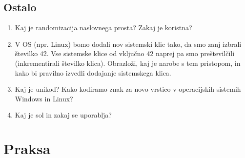 \documentclass{book}
\begin{document}
\section{Ostalo}
\begin{enumerate}
    \item Kaj je randomizacija naslovnega prosta? Zakaj je koristna?
    \item V OS (npr. Linux) bomo dodali nov sistemski klic tako, da smo zanj izbrali številko 42. Vse sistemske klice od vključno 42 naprej pa smo preštevilčili (inkrementirali številko klica). Obrazloži, kaj je narobe s tem pristopom, in kako bi pravilno izvedli dodajanje sistemskega klica.
    \item Kaj je unikod? Kako kodiramo znak za novo vrstico v operacijskih sistemih Windows in Linux?
    \item Kaj je sol in zakaj se uporablja?
\end{enumerate}

\chapter{Praksa}
\end{document}
